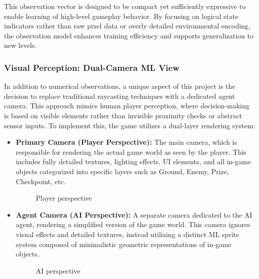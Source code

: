 \documentclass[12pt,oneside,openright,a4paper]{cpe-english-project}
\begin{document}
This observation vector is designed to be compact yet sufficiently expressive to enable learning of high-level gameplay behavior. By focusing on logical state indicators rather than raw pixel data or overly detailed environmental encoding, the observation model enhances training efficiency and supports generalization to new levels.

\subsubsection{Visual Perception: Dual-Camera ML View}

In addition to numerical observations, a unique aspect of this project is the decision to replace traditional raycasting techniques with a dedicated agent camera. This approach mimics human player perception, where decision-making is based on visible elements rather than invisible proximity checks or abstract sensor inputs.
To implement this, the game utilizes a dual-layer rendering system:
\begin{itemize}
\item  \textbf{Primary Camera (Player Perspective):}
The main camera, which is responsible for rendering the actual game world as seen by the player. This includes fully detailed textures, lighting effects, UI elements, and all in-game objects categorized into specific layers such as Ground, Enemy, Prize, Checkpoint, etc.
\begin{figure}[H]
\centering
{}
\caption{Player perspective}\label{fig:PlayerPers}
\end{figure}
\item  \textbf{Agent Camera (AI Perspective):}
A separate camera dedicated to the AI agent, rendering a simplified version of the game world. This camera ignores visual effects and detailed textures, instead utilizing a distinct ML sprite system composed of minimalistic geometric representations of in-game objects.
\begin{figure}[H]
\centering
{}
\caption{AI perspective}\label{fig:AIPers}
\end{figure}
\end{itemize}
\end{document}

